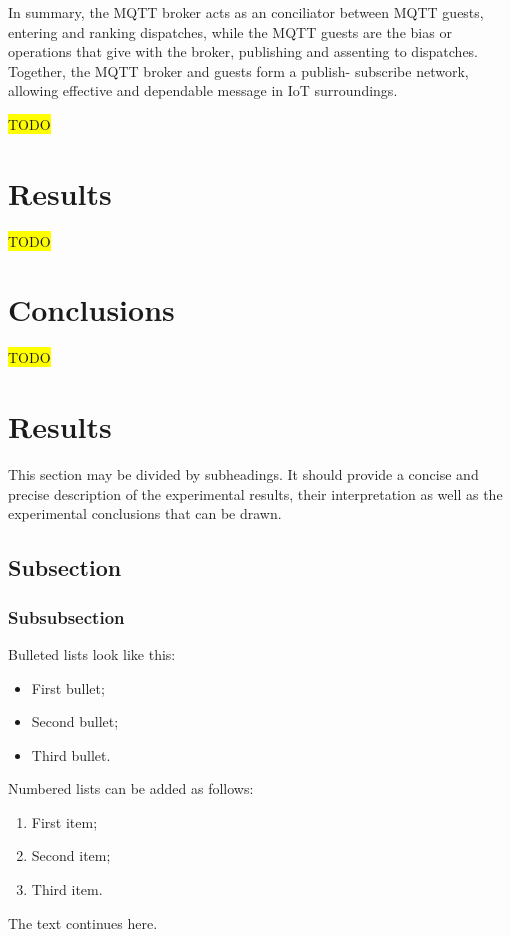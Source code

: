 \documentclass[journal,article,submit,pdftex,moreauthors]{Definitions/mdpi}
\begin{document}
In summary, the MQTT broker acts as an conciliator between MQTT guests, entering and ranking dispatches, while the MQTT guests are the bias or operations that give with the broker, publishing and assenting to dispatches. Together, the MQTT broker and guests form a publish- subscribe network, allowing effective and dependable message in IoT surroundings.


\colorbox{yellow}{TODO}

\section{Results}
\colorbox{yellow}{TODO}

\section{Conclusions}
\colorbox{yellow}{TODO}


\section{Results}

This section may be divided by subheadings. It should provide a concise and precise description of the experimental results, their interpretation as well as the experimental conclusions that can be drawn.
\subsection{Subsection}
\subsubsection{Subsubsection}

Bulleted lists look like this:
\begin{itemize}
\item	First bullet;
\item	Second bullet;
\item	Third bullet.
\end{itemize}

Numbered lists can be added as follows:
\begin{enumerate}
\item	First item; 
\item	Second item;
\item	Third item.
\end{enumerate}

The text continues here. 
\end{document}
